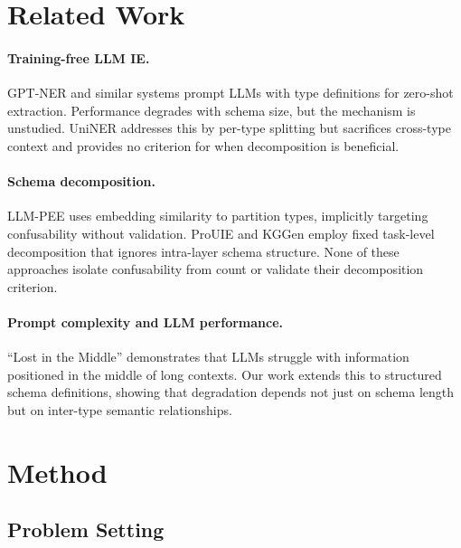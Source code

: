 \documentclass[11pt,a4paper]{article}
\begin{document}
\section{Related Work}
\label{sec:related}

\paragraph{Training-free LLM IE.}
GPT-NER \cite{wang2023gptner} and similar systems prompt LLMs with type definitions for zero-shot extraction. Performance degrades with schema size, but the mechanism is unstudied. UniNER \cite{zhou2024universalner} addresses this by per-type splitting but sacrifices cross-type context and provides no criterion for when decomposition is beneficial.

\paragraph{Schema decomposition.}
LLM-PEE uses embedding similarity to partition types, implicitly targeting confusability without validation. ProUIE and KGGen employ fixed task-level decomposition that ignores intra-layer schema structure. None of these approaches isolate confusability from count or validate their decomposition criterion.

\paragraph{Prompt complexity and LLM performance.}
``Lost in the Middle'' \cite{liu2024lost} demonstrates that LLMs struggle with information positioned in the middle of long contexts. Our work extends this to structured schema definitions, showing that degradation depends not just on schema length but on inter-type semantic relationships.

\section{Method}
\label{sec:method}

\subsection{Problem Setting}
\end{document}
